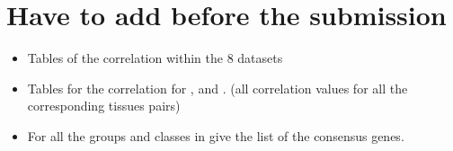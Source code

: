 \section{Have to add before the submission}
\begin{itemize}
 \item Tables of the correlation within the 8 datasets
 \item Tables for the correlation for \setOne, and \setTwo. (all correlation
     values for all the corresponding tissues pairs)
 \item For all the groups and classes in  give the list
     of the consensus genes.
\end{itemize}
